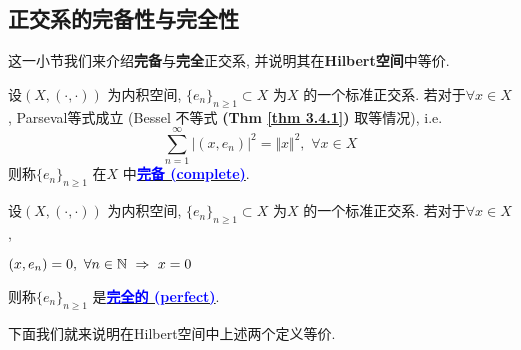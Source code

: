 \newpage

\subsection{正交系的完备性与完全性}
	这一小节我们来介绍\textbf{完备}与\textbf{完全}正交系, 并说明其在\textbf{Hilbert空间}中等价. 
	
	\vspace{1em}
	
	\begin{defn}\label{def 3.4.2}
		设$(X , (\cdot , \cdot))$ 为内积空间, $\{ e_n \}_{n \geq 1} \subset X$ 为$X$ 的一个标准正交系. 若对于$\forall x \in X$, Parseval等式成立 (Bessel 不等式 \textbf{(Thm \ref{thm 3.4.1})} 取等情况), i.e.
		\[ \sum_{n = 1}^{\infty} \Big| (x , e_n) \Big|^2 = \Vert x \Vert^2 , \,\, \forall x \in X \]
		则称$\{ e_n \}_{n \geq 1}$ 在$X$ 中\underline{\textcolor{blue}{\textbf{完备 (complete)}}}. 
	\end{defn}

	\vspace{2em}
	
	\begin{defn}\label{def 3.4.3}
		设$(X , (\cdot , \cdot))$ 为内积空间, $\{ e_n \}_{n \geq 1} \subset X$ 为$X$ 的一个标准正交系. 若对于$\forall x \in X$, 
		\begin{center}
			$(x , e_n) = 0 , \,\, \forall n \in \mathbb{N} \,\, \Rightarrow \,\, x = 0$
		\end{center}
		则称$\{ e_n \}_{n \geq 1}$ 是\underline{\textcolor{blue}{\textbf{完全的 (perfect)}}}. 
	\end{defn}
	
	\vspace{5em}
	
	下面我们就来说明在Hilbert空间中上述两个定义等价. 
	
	\vspace{1em}
	
